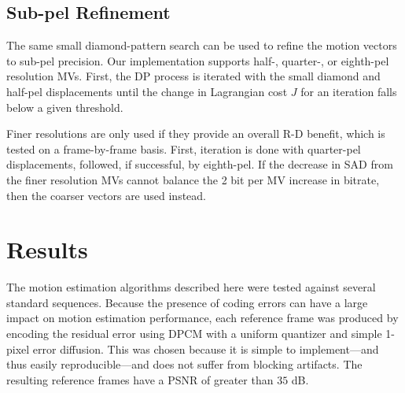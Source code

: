 \documentclass[11pt,letterpaper]{article}
\begin{document}


\subsection{Sub-pel Refinement}

The same small diamond-pattern search can be used to refine the motion vectors
 to sub-pel precision.
Our implementation supports half-, quarter-, or eighth-pel resolution MVs.
First, the DP process is iterated with the small diamond and half-pel
 displacements until the change in Lagrangian cost $J$ for an iteration falls
 below a given threshold.

Finer resolutions are only used if they provide an overall R-D benefit, which
 is tested on a frame-by-frame basis.
First, iteration is done with quarter-pel displacements, followed, if
 successful, by eighth-pel.
If the decrease in SAD from the finer resolution MVs cannot balance the 2 bit
 per MV increase in bitrate, then the coarser vectors are used instead.

\section{Results}

The motion estimation algorithms described here were tested against several
 standard sequences.
Because the presence of coding errors can have a large impact on motion
 estimation performance, each reference frame was produced by encoding the
 residual error using DPCM with a uniform quantizer and simple 1-pixel error
 diffusion.
This was chosen because it is simple to implement---and thus easily
 reproducible---and does not suffer from blocking artifacts.
The resulting reference frames have a PSNR of greater than $35$ dB.


\end{document}
